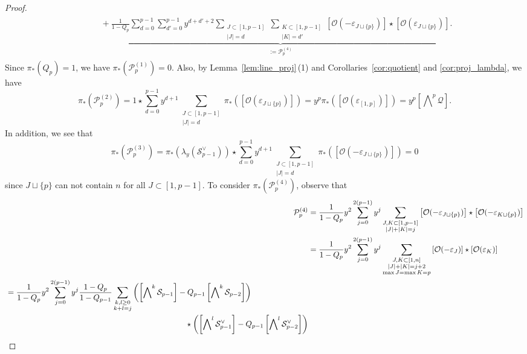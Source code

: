 \documentclass[a4paper, 11pt, reqno]{amsart}
\numberwithin{equation}{section}
\newcommand{\CO}{\mathcal{O}}
\newcommand{\CP}{\mathcal{P}}
\newcommand{\CQ}{\mathcal{Q}}
\newcommand{\CS}{\mathcal{S}}
\newcommand{\ve}{\varepsilon}
\newcommand{\class}[1]{\left[ #1 \right]}
\newcommand{\extprod}{\bigwedge\nolimits}
\theoremstyle{plain}
\theoremstyle{definition}
\theoremstyle{remark}
\begin{document}
\begin{proof}
\begin{align}
\begin{split}
& \qquad + \underbrace{\frac{1}{1-Q_{p}}\sum_{d=0}^{p-1} \sum_{d'=0}^{p-1} y^{d+d'+2} \sum_{\substack{J \subset [1, p-1] \\ |J|=d}} \sum_{\substack{K \subset [1, p-1] \\ |K|=d'}} \class{\CO(-\ve_{J\sqcup\{p\}})} \star \class{\CO(\ve_{J\sqcup\{p\}})}}_{:= \CP_{p}^{(4)}}. 
\end{split}
\end{align}
Since $\pi_{\ast}(Q_{p}) = 1$, we have $\pi_{\ast}(\CP_{p}^{(1)}) = 0$. Also, by Lemma~\ref{lem:line_proj}\,(1) and Corollaries~\ref{cor:quotient} and \ref{cor:proj_lambda}, we have 
\begin{equation}
\pi_{\ast}(\CP_{p}^{(2)}) = 1 \star \sum_{d=0}^{p-1}y^{d+1} \sum_{\substack{J \subset [1, p-1] \\ |J|=d}} \pi_{\ast}\left( \class{\CO(\ve_{J\sqcup\{p\}})} \right) = y^{p} \pi_{\ast}\left( \class{\CO(\ve_{[1,p]})} \right) = y^{p} \class{\extprod^{p} \CQ}. 
\end{equation}
In addition, we see that 
\begin{equation}
\pi_{\ast}(\CP_{p}^{(3)}) = \pi_{\ast}(\lambda_{y}(\CS_{p-1}^{\vee})) \star \sum_{d=0}^{p-1} y^{d+1} \sum_{\substack{J \subset [1, p-1] \\ |J|=d}} \pi_{\ast} \left( \class{\CO(-\ve_{J\sqcup\{p\}})} \right) = 0
\end{equation}
since $J \sqcup \{p\}$ can not contain $n$ for all $J \subset [1, p-1]$. To consider $\pi_{\ast}(\CP_{p}^{(4)})$, observe that 
\begin{align}
\CP_{p}^{(4)} &= \frac{1}{1-Q_{p}}y^{2} \sum_{j=0}^{2(p-1)} y^{j} \sum_{\substack{J, K \subset [1, p-1] \\ |J|+|K| = j}} \class{\CO(-\ve_{J\sqcup\{p\}})} \star \class{\CO(-\ve_{K\sqcup\{p\}})} \\ 
&= \frac{1}{1-Q_{p}} y^{2} \sum_{j=0}^{2(p-1)} y^{j} \sum_{\substack{J, K \subset [1, n] \\ |J|+|K| = j+2 \\ \max J = \max K = p}} \class{\CO(-\ve_{J})} \star \class{\CO(\ve_{K})} \\ 
\begin{split}
&= \frac{1}{1-Q_{p}} y^{2} \sum_{j=0}^{2(p-1)} y^{j} \frac{1-Q_{p}}{1-Q_{p-1}} \sum_{\substack{k, l \ge 0 \\ k+l = j}} \left( \left[ \extprod^{k} \CS_{p-1} \right] - Q_{p-1} \left[ \extprod^{k} \CS_{p-2} \right] \right) \\ 
& \hspace{80mm} \star \left( \left[ \extprod^{l} \CS_{p-1}^{\vee} \right] - Q_{p-1} \left[ \extprod^{l} \CS_{p-2}^{\vee} \right] \right) 

\end{split}
\end{align}
\end{proof}
\end{document}
